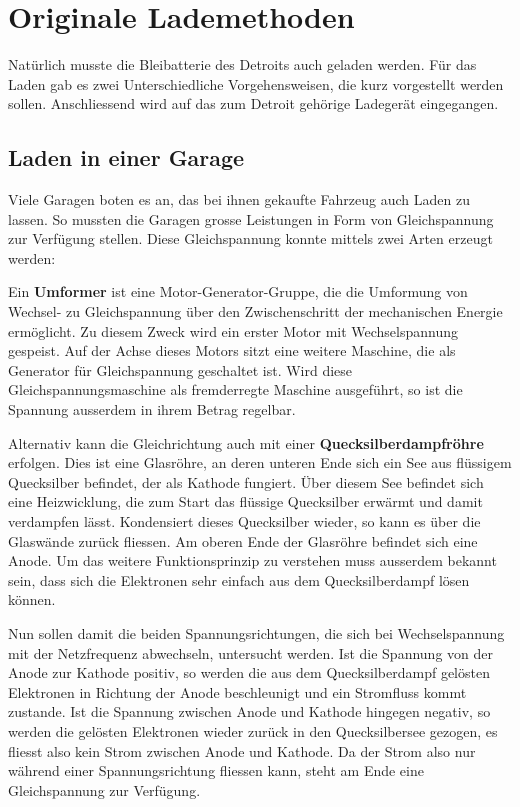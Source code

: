 \section{Originale Lademethoden}

Natürlich musste die Bleibatterie des Detroits auch geladen werden. Für das Laden gab es zwei Unterschiedliche Vorgehensweisen, die kurz vorgestellt werden sollen. Anschliessend wird auf das zum Detroit gehörige Ladegerät eingegangen.

\subsection{Laden in einer Garage}
Viele Garagen boten es an, das bei ihnen gekaufte Fahrzeug auch Laden zu lassen. So mussten die Garagen grosse Leistungen in Form von Gleichspannung zur Verfügung stellen. Diese Gleichspannung konnte mittels zwei Arten erzeugt werden:

Ein \textbf{Umformer} ist eine Motor-Generator-Gruppe, die die Umformung von Wechsel- zu Gleichspannung über den Zwischenschritt der mechanischen Energie ermöglicht. Zu diesem Zweck wird ein erster Motor mit Wechselspannung gespeist. Auf der Achse dieses Motors sitzt eine weitere Maschine, die als Generator für Gleichspannung geschaltet ist. Wird diese Gleichspannungsmaschine als fremderregte Maschine ausgeführt, so ist die Spannung ausserdem in ihrem Betrag regelbar.

Alternativ kann die Gleichrichtung auch mit einer \textbf{Quecksilberdampfröhre} erfolgen. Dies ist eine Glasröhre, an deren unteren Ende sich ein See aus flüssigem Quecksilber befindet, der als Kathode fungiert. Über diesem See befindet sich eine Heizwicklung, die zum Start das flüssige Quecksilber erwärmt und damit verdampfen lässt. Kondensiert dieses Quecksilber wieder, so kann es über die Glaswände zurück fliessen. Am oberen Ende der Glasröhre befindet sich eine Anode. Um das weitere Funktionsprinzip zu verstehen muss ausserdem bekannt sein, dass sich die Elektronen sehr einfach aus dem Quecksilberdampf lösen können.

Nun sollen damit die beiden Spannungsrichtungen, die sich bei Wechselspannung mit der Netzfrequenz abwechseln, untersucht werden. Ist die Spannung von der Anode zur Kathode positiv, so werden die aus dem Quecksilberdampf gelösten Elektronen in Richtung der Anode beschleunigt und ein Stromfluss kommt zustande. Ist die Spannung zwischen Anode und Kathode hingegen negativ, so werden die gelösten Elektronen wieder zurück in den Quecksilbersee gezogen, es fliesst also kein Strom zwischen Anode und Kathode. Da der Strom also nur während einer Spannungsrichtung fliessen kann, steht am Ende eine Gleichspannung zur Verfügung.

